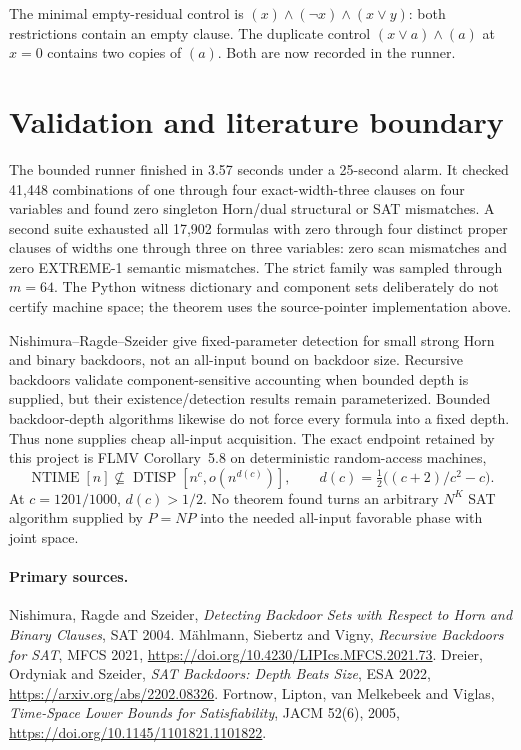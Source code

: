 \documentclass[11pt]{article}
\begin{document}
The minimal empty-residual control is
$(x)\wedge(\neg x)\wedge(x\vee y)$: both restrictions contain an empty
clause.  The duplicate control
$(x\vee a)\wedge(a)$ at $x=0$ contains two copies of $(a)$.  Both are now
recorded in the runner.

\section{Validation and literature boundary}

The bounded runner finished in 3.57 seconds under a 25-second alarm.  It
checked 41,448 combinations of one through four exact-width-three clauses on
four variables and found zero singleton Horn/dual structural or SAT
mismatches.  A second suite exhausted all 17,902 formulas with zero through
four distinct proper clauses of widths one through three on three variables:
zero scan mismatches and zero \textsc{EXTREME-1} semantic mismatches.  The
strict family was sampled through $m=64$.  The Python witness dictionary and
component sets deliberately do not certify machine space; the theorem uses
the source-pointer implementation above.

Nishimura--Ragde--Szeider give fixed-parameter detection for small strong
Horn and binary backdoors, not an all-input bound on backdoor size.  Recursive
backdoors validate component-sensitive accounting when bounded depth is
supplied, but their existence/detection results remain parameterized.
Bounded backdoor-depth algorithms likewise do not force every formula into a
fixed depth.  Thus none supplies cheap all-input acquisition.  The exact
endpoint retained by this project is FLMV Corollary~5.8 on deterministic
random-access machines,
\[
\operatorname{NTIME}[n]\not\subseteq
\operatorname{DTISP}[n^c,o(n^{d(c)})],\qquad
d(c)=\tfrac12\bigl((c+2)/c^2-c\bigr).
\]
At $c=1201/1000$, $d(c)>1/2$.  No theorem found turns an arbitrary
$N^K$ SAT algorithm supplied by $P=NP$ into the needed all-input favorable
phase with joint space.

\paragraph{Primary sources.}
Nishimura, Ragde and Szeider, \emph{Detecting Backdoor Sets with Respect to
Horn and Binary Clauses}, SAT 2004.  M\"ahlmann, Siebertz and Vigny,
\emph{Recursive Backdoors for SAT}, MFCS 2021,
\url{https://doi.org/10.4230/LIPIcs.MFCS.2021.73}.  Dreier, Ordyniak and
Szeider, \emph{SAT Backdoors: Depth Beats Size}, ESA 2022,
\url{https://arxiv.org/abs/2202.08326}.  Fortnow, Lipton, van Melkebeek and
Viglas, \emph{Time-Space Lower Bounds for Satisfiability}, JACM 52(6), 2005,
\url{https://doi.org/10.1145/1101821.1101822}.
\end{document}
